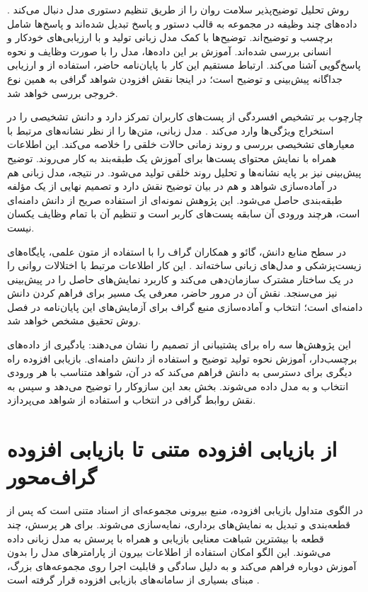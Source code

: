 روش  تحلیل توضیح‌پذیر سلامت روان را از طریق تنظیم دستوری مدل دنبال می‌کند \cite{yang2024mentallama}. داده‌های چند وظیفه در مجموعه  به قالب دستور و پاسخ تبدیل شده‌اند و پاسخ‌ها شامل برچسب و توضیح‌اند. توضیح‌ها با کمک مدل زبانی تولید و با ارزیابی‌های خودکار و انسانی بررسی شده‌اند. آموزش بر این داده‌ها، مدل را با صورت وظایف و نحوه پاسخ‌گویی آشنا می‌کند. ارتباط مستقیم این کار با پایان‌نامه حاضر، استفاده از  و ارزیابی جداگانه پیش‌بینی و توضیح است؛ در اینجا نقش افزودن شواهد گرافی به همین نوع خروجی بررسی خواهد شد.

چارچوب  بر تشخیص افسردگی از پست‌های کاربران تمرکز دارد و دانش تشخیصی را در استخراج ویژگی‌ها وارد می‌کند \cite{lan2025doris}. مدل زبانی، متن‌ها را از نظر نشانه‌های مرتبط با معیارهای تشخیصی بررسی و روند زمانی حالات خلقی را خلاصه می‌کند. این اطلاعات همراه با نمایش محتوای پست‌ها برای آموزش یک طبقه‌بند به کار می‌روند. توضیح پیش‌بینی نیز بر پایه نشانه‌ها و تحلیل روند خلقی تولید می‌شود. در نتیجه، مدل زبانی هم در آماده‌سازی شواهد و هم در بیان توضیح نقش دارد و تصمیم نهایی از یک مؤلفه طبقه‌بندی حاصل می‌شود. این پژوهش نمونه‌ای از استفاده صریح از دانش دامنه‌ای است، هرچند ورودی آن سابقه پست‌های کاربر است و تنظیم آن با تمام وظایف  یکسان نیست.

در سطح منابع دانش، گائو و همکاران گراف  را با استفاده از متون علمی، پایگاه‌های زیست‌پزشکی و مدل‌های زبانی ساخته‌اند \cite{gao2025mdkg}. این کار اطلاعات مرتبط با اختلالات روانی را در یک ساختار مشترک سازمان‌دهی می‌کند و کاربرد نمایش‌های حاصل را در پیش‌بینی نیز می‌سنجد. نقش آن در مرور حاضر، معرفی یک مسیر برای فراهم کردن دانش دامنه‌ای است؛ انتخاب و آماده‌سازی منبع گراف برای آزمایش‌های این پایان‌نامه در فصل روش تحقیق مشخص خواهد شد.

این پژوهش‌ها سه راه برای پشتیبانی از تصمیم را نشان می‌دهند: یادگیری از داده‌های برچسب‌دار، آموزش نحوه تولید توضیح و استفاده از دانش دامنه‌ای. بازیابی افزوده راه دیگری برای دسترسی به دانش فراهم می‌کند که در آن، شواهد متناسب با هر ورودی انتخاب و به مدل داده می‌شوند. بخش بعد این سازوکار را توضیح می‌دهد و سپس به نقش روابط گرافی در انتخاب و استفاده از شواهد می‌پردازد.

\section{از بازیابی افزوده متنی تا بازیابی افزوده گراف‌محور}

در الگوی متداول بازیابی افزوده، منبع بیرونی مجموعه‌ای از اسناد متنی است که پس از قطعه‌بندی و تبدیل به نمایش‌های برداری، نمایه‌سازی می‌شوند. برای هر پرسش، چند قطعه با بیشترین شباهت معنایی بازیابی و همراه با پرسش به مدل زبانی داده می‌شوند. این الگو امکان استفاده از اطلاعات بیرون از پارامترهای مدل را بدون آموزش دوباره فراهم می‌کند و به دلیل سادگی و قابلیت اجرا روی مجموعه‌های بزرگ، مبنای بسیاری از سامانه‌های بازیابی افزوده قرار گرفته است \cite{lewis2020retrieval}.

